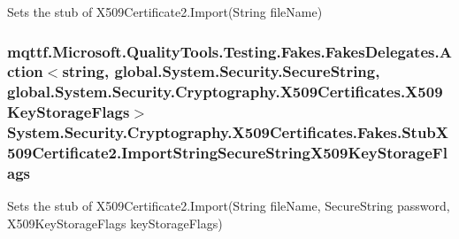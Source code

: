 Sets the stub of X509\-Certificate2.\-Import(\-String file\-Name)

\hypertarget{class_system_1_1_security_1_1_cryptography_1_1_x509_certificates_1_1_fakes_1_1_stub_x509_certificate2_a80ec4e6d9e60648bbeb57047a42625f9}{
\subsubsection[{Import\-String\-Secure\-String\-X509\-Key\-Storage\-Flags}]{\setlength{\rightskip}{0pt plus 5cm}mqttf.\-Microsoft.\-Quality\-Tools.\-Testing.\-Fakes.\-Fakes\-Delegates.\-Action$<$string, global.\-System.\-Security.\-Secure\-String, global.\-System.\-Security.\-Cryptography.\-X509\-Certificates.\-X509\-Key\-Storage\-Flags$>$ System.\-Security.\-Cryptography.\-X509\-Certificates.\-Fakes.\-Stub\-X509\-Certificate2.\-Import\-String\-Secure\-String\-X509\-Key\-Storage\-Flags}}\label{class_system_1_1_security_1_1_cryptography_1_1_x509_certificates_1_1_fakes_1_1_stub_x509_certificate2_a80ec4e6d9e60648bbeb57047a42625f9}


Sets the stub of X509\-Certificate2.\-Import(\-String file\-Name, Secure\-String password, X509\-Key\-Storage\-Flags key\-Storage\-Flags)

